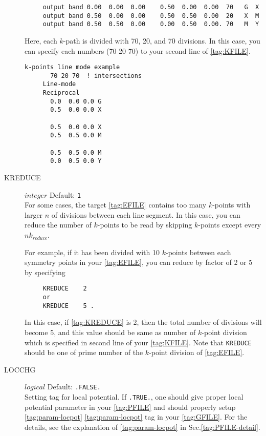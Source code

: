 \documentclass[a4paper,12pt]{scrartcl}
\makeatletter
\def\namedlabel#1#2{\begingroup
    #2%
    \def\@currentlabel{#2}%
    \phantomsection\label{#1}\endgroup
}
\makeatother
\begin{document}
\begin{description}
     \begin{verbatim}
     output band 0.00  0.00  0.00    0.50  0.00  0.00  70   G  X
     output band 0.50  0.00  0.00    0.50  0.50  0.00  20   X  M
     output band 0.50  0.50  0.00    0.00  0.50  0.00. 70   M  Y
     \end{verbatim}
     
     Here, each $k$-path is divided with 70, 20, and 70 divisions.
     In this case, you can specify each numbers (70 20 70) to your second line of  \ref{tag:KFILE}.

        \begin{Verbatim}[commandchars=\\\{\},gobble=4, frame=single, framesep=2mm, 
            label= KPOINTS\_BAND $line$ $mode$ (FHI-aims type), 
            labelposition=bottomline]
     k-points line mode example
       70 20 70  ! intersections
     Line-mode
     Reciprocal
       0.0  0.0 0.0 G
       0.5  0.0 0.0 X
       
       0.5  0.0 0.0 X
       0.5  0.5 0.0 M

       0.5  0.5 0.0 M
       0.0  0.5 0.0 Y
        \end{Verbatim}        

  	
  	\item[\namedlabel{tag:KREDUCE}{KREDUCE}] $integer$ Default: \texttt{1}  \\
		For some cases, the target \ref{tag:EFILE} contains too many $k$-points with 
		larger $n$ of divisions between each line segment. In this case, 
		you can reduce the number of $k$-points to be read by skipping $k$-points except every $nk_{reduce}$. 
	
		For example, if it has been divided with 10 $k$-points between each symmetry points in your \ref{tag:EFILE}, you can reduce by factor of 2 or 5 by specifying 
     \begin{verbatim}
     KREDUCE    2
     or
     KREDUCE    5 .
     \end{verbatim}
	  In this case, if \ref{tag:KREDUCE} is 2, then the total number of divisions will
	  become 5, and this value should be same as number of $k$-point division 
	  which is specified in second line of your \ref{tag:KFILE}. 
	  Note that \texttt{KREDUCE} should be one of prime number of the 
	  $k$-point division of \ref{tag:EFILE}. 
	  
    \item[\namedlabel{tag:LOCCHG}{LOCCHG}] $logical$ Default: \texttt{.FALSE.} \\
        Setting tag for local potential.
        If \texttt{.TRUE.}, one should give proper local potential parameter 
		in your \ref{tag:PFILE} and should properly setup \ref{tag:param-locpot} \ref{tag:param-locpot} 
		tag in your \ref{tag:GFILE}. For the details, see the explanation of
		\ref{tag:param-locpot} in Sec.\ref{tag:PFILE-detail}.


\end{description}
\end{document}
